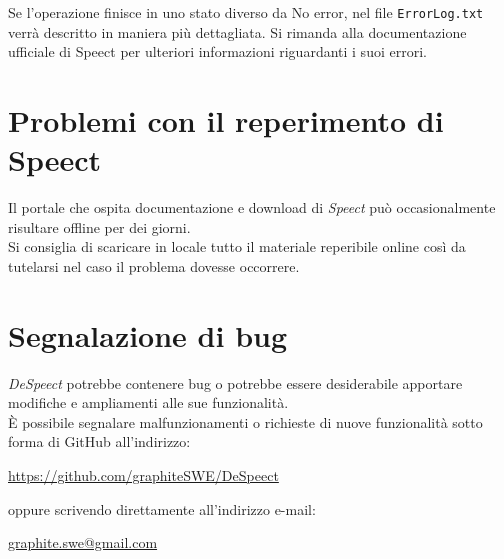\documentclass[openany,12pt,a4paper]{report}
\begin{document}
	\noindent Se l'operazione finisce in uno stato diverso da No error, nel file \verb|ErrorLog.txt| verrà descritto in maniera più dettagliata. Si rimanda alla documentazione ufficiale di Speect per ulteriori informazioni riguardanti i suoi errori.
	
	\section{Problemi con il reperimento di Speect}	
	Il portale che ospita documentazione e download di \textit{Speect} può occasionalmente risultare offline per dei giorni.\\
	Si consiglia di scaricare in locale tutto il materiale reperibile online così da tutelarsi nel caso il problema dovesse occorrere.
	
	\section{Segnalazione di bug}
	
	\textit{DeSpeect} potrebbe contenere bug o potrebbe essere desiderabile apportare modifiche e ampliamenti alle sue funzionalità. \\ È possibile segnalare malfunzionamenti o richieste di nuove funzionalità sotto forma di GitHub  all’indirizzo:
	\begin{center}
		\url{https://github.com/graphiteSWE/DeSpeect}
	\end{center}
  oppure scrivendo direttamente all'indirizzo e-mail:
  \begin{center}
  	\url{graphite.swe@gmail.com}
  \end{center}
	
	\appendix
	
	\printglossary[style=glossaryStyle, nonumberlist]
	
\end{document}

